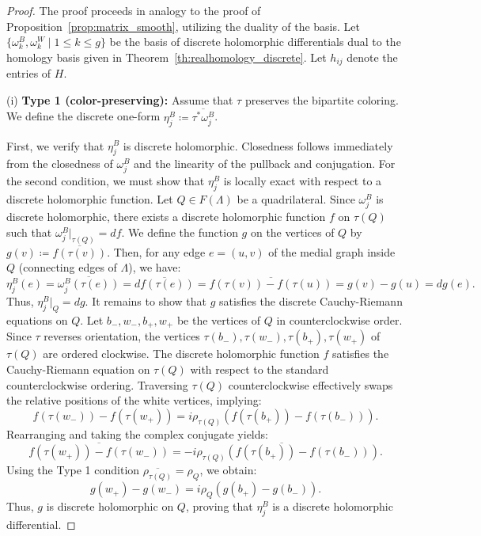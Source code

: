 \documentclass[11pt,a4paper]{article}
\theoremstyle{definition}
\begin{document}
\begin{proof}
	The proof proceeds in analogy to the proof of Proposition~\ref{prop:matrix_smooth}, utilizing the duality of the basis. Let $\{\omega_k^B,\omega_k^W \mid 1 \leq k \leq g\}$ be the basis of discrete holomorphic differentials dual to the homology basis given in Theorem~\ref{th:realhomology_discrete}. Let $h_{ij}$ denote the entries of $H$.
	
	(i) \textbf{Type 1 (color-preserving):} Assume that $\tau$ preserves the bipartite coloring. We define the discrete one-form $\eta_j^B \coloneq \overline{\tau^* \omega_j^B}$.
	
	First, we verify that $\eta_j^B$ is discrete holomorphic. Closedness follows immediately from the closedness of $\omega_j^B$ and the linearity of the pullback and conjugation. For the second condition, we must show that $\eta_j^B$ is locally exact with respect to a discrete holomorphic function.
	Let $Q \in F(\Lambda)$ be a quadrilateral. Since $\omega_j^B$ is discrete holomorphic, there exists a discrete holomorphic function $f$ on $\tau(Q)$ such that $\omega_j^B|_{\tau(Q)} = df$. We define the function $g$ on the vertices of $Q$ by $g(v) \coloneqq \overline{f(\tau(v))}$. Then, for any edge $e=(u,v)$ of the medial graph inside $Q$ (connecting edges of $\Lambda$), we have:
	\[
	\eta_j^B(e) = \overline{\omega_j^B(\tau(e))} = \overline{df(\tau(e))} = \overline{f(\tau(v)) - f(\tau(u))} = g(v) - g(u) = dg(e).
	\]
	Thus, $\eta_j^B|_Q = dg$. It remains to show that $g$ satisfies the discrete Cauchy-Riemann equations on $Q$. Let $b_-, w_-, b_+, w_+$ be the vertices of $Q$ in counterclockwise order. Since $\tau$ reverses orientation, the vertices $\tau(b_-), \tau(w_-), \tau(b_+), \tau(w_+)$ of $\tau(Q)$ are ordered clockwise. The discrete holomorphic function $f$ satisfies the Cauchy-Riemann equation on $\tau(Q)$ with respect to the standard counterclockwise ordering. Traversing $\tau(Q)$ counterclockwise effectively swaps the relative positions of the white vertices, implying:
	\[
	f(\tau(w_-)) - f(\tau(w_+)) = i \rho_{\tau(Q)} (f(\tau(b_+)) - f(\tau(b_-))).
	\]
	Rearranging and taking the complex conjugate yields:
	\[
	\overline{f(\tau(w_+)) - f(\tau(w_-))} = \overline{- i \rho_{\tau(Q)} (f(\tau(b_+)) - f(\tau(b_-)))}.
	\]
	Using the Type 1 condition $\overline{\rho_{\tau(Q)}} = \rho_Q$, we obtain:
	\[
	g(w_+) - g(w_-) = i \rho_Q (g(b_+) - g(b_-)).
	\]
	Thus, $g$ is discrete holomorphic on $Q$, proving that $\eta_j^B$ is a discrete holomorphic differential.
	

\end{proof}
\end{document}
